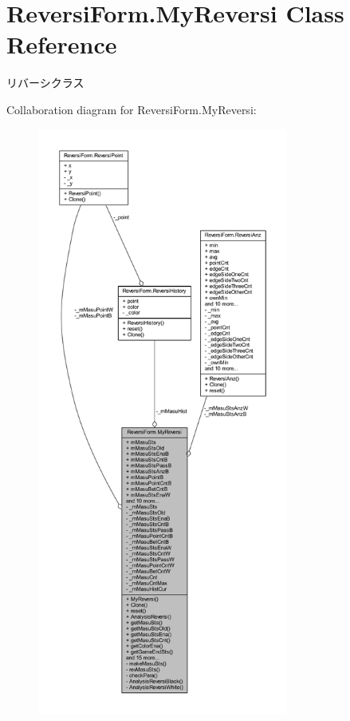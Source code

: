 \hypertarget{class_reversi_form_1_1_my_reversi}{}\section{Reversi\+Form.\+My\+Reversi Class Reference}
\label{class_reversi_form_1_1_my_reversi}


リバーシクラス  




Collaboration diagram for Reversi\+Form.\+My\+Reversi\+:\nopagebreak
\begin{figure}[H]
\begin{center}
\leavevmode
\includegraphics[height=550pt]{class_reversi_form_1_1_my_reversi__coll__graph}
\end{center}
\end{figure}
